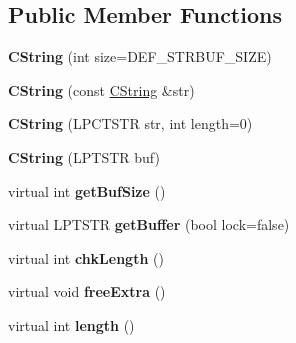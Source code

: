 \subsection*{Public Member Functions}
\begin{DoxyCompactItemize}
\item 
\hypertarget{class_c_string_a3cb66b8f688676f29cdb51c914a15cf7}{{\bfseries C\-String} (int size=D\-E\-F\-\_\-\-S\-T\-R\-B\-U\-F\-\_\-\-S\-I\-Z\-E)}\label{class_c_string_a3cb66b8f688676f29cdb51c914a15cf7}

\item 
\hypertarget{class_c_string_a4866844f29a912ee7eb7afcb641ffb8f}{{\bfseries C\-String} (const \hyperlink{class_c_string}{C\-String} \&str)}\label{class_c_string_a4866844f29a912ee7eb7afcb641ffb8f}

\item 
\hypertarget{class_c_string_a233297b331dbc4c342745d67ad166b97}{{\bfseries C\-String} (L\-P\-C\-T\-S\-T\-R str, int length=0)}\label{class_c_string_a233297b331dbc4c342745d67ad166b97}

\item 
\hypertarget{class_c_string_a4cc7726fc9fbaa450876ffd98e3e6ff4}{{\bfseries C\-String} (L\-P\-T\-S\-T\-R buf)}\label{class_c_string_a4cc7726fc9fbaa450876ffd98e3e6ff4}

\item 
\hypertarget{class_c_string_a1cc58a690ea6c9b8c4d7a9118fe3cc18}{virtual int {\bfseries get\-Buf\-Size} ()}\label{class_c_string_a1cc58a690ea6c9b8c4d7a9118fe3cc18}

\item 
\hypertarget{class_c_string_ac7b886c37095673cc287d24100a9f3fd}{virtual L\-P\-T\-S\-T\-R {\bfseries get\-Buffer} (bool lock=false)}\label{class_c_string_ac7b886c37095673cc287d24100a9f3fd}

\item 
\hypertarget{class_c_string_a5f5361665c7568d502d058992b14c016}{virtual int {\bfseries chk\-Length} ()}\label{class_c_string_a5f5361665c7568d502d058992b14c016}

\item 
\hypertarget{class_c_string_a9cb7e6111fd46dd4d16a111ffe4af39d}{virtual void {\bfseries free\-Extra} ()}\label{class_c_string_a9cb7e6111fd46dd4d16a111ffe4af39d}

\item 
\hypertarget{class_c_string_a8f131c0e097bea62d809acbc995807b9}{virtual int {\bfseries length} ()}\label{class_c_string_a8f131c0e097bea62d809acbc995807b9}


\end{DoxyCompactItemize}
